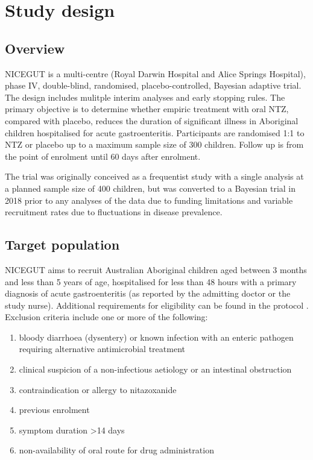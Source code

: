 \documentclass[a4paper]{article}
\begin{document}
\section{Study design}

\subsection{Overview}

NICEGUT is a multi-centre (Royal Darwin Hospital and Alice Springs Hospital), phase IV, double-blind, randomised, placebo-controlled, Bayesian adaptive trial.
The design includes mulitple interim analyses and early stopping rules.
The primary objective is to determine whether empiric treatment with oral NTZ, compared with placebo, reduces the duration of significant illness in Aboriginal children hospitalised for acute gastroenteritis.
Participants are randomised 1:1 to NTZ or placebo up to a maximum sample size of 300 children.
Follow up is from the point of enrolment until 60 days after enrolment.

The trial was originally conceived as a frequentist study with a single analysis at a planned sample size of 400 children, but was converted to a Bayesian trial in 2018 prior to any analyses of the data due to funding limitations and variable recruitment rates due to fluctuations in disease prevalence.

\subsection{Target population}

NICEGUT aims to recruit Australian Aboriginal children aged between 3 months and less than 5 years of age, hospitalised for less than 48 hours with a primary diagnosis of acute gastroenteritis (as reported by the admitting doctor or the study nurse).
Additional requirements for eligibility can be found in the protocol \cite{Waddingtone019632}.
Exclusion criteria include one or more of the following:
\begin{enumerate}
    \item bloody diarrhoea (dysentery) or known infection with an enteric pathogen requiring alternative antimicrobial treatment
    \item clinical suspicion of a non-infectious aetiology or an intestinal obstruction
    \item contraindication or allergy to nitazoxanide
    \item previous enrolment
    \item symptom duration >14 days
    \item non-availability of oral route for drug administration
\end{enumerate}
\end{document}
